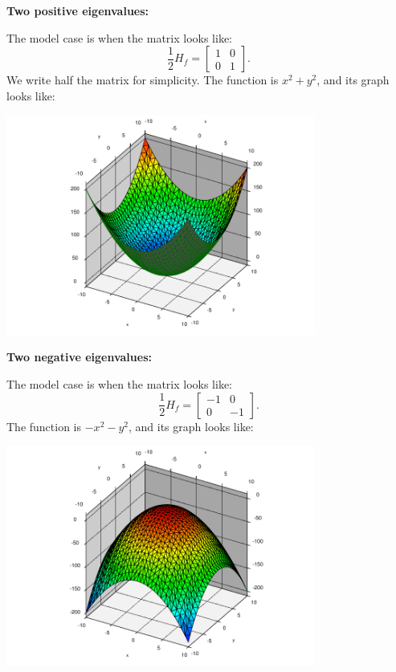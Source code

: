 \documentclass[12pt]{article}
\begin{document}
\bigskip

\textbf{Two positive eigenvalues:}
\nopagebreak

The model case is when the matrix looks like:
\begin{equation*}
\frac{1}{2} H_f
=
\begin{bmatrix}
1 & 0 \\
0 & 1
\end{bmatrix} .
\end{equation*}
We write half the matrix for simplicity.
The function is $x^2+y^2$, and
its graph looks like:
\begin{center}
\includegraphics[width=4.0in]{xsqplusysq}
\end{center}

\bigskip

\pagebreak[2]
\textbf{Two negative eigenvalues:}

The model case is when the matrix looks like:
\begin{equation*}
\frac{1}{2} H_f
=
\begin{bmatrix}
-1 & 0 \\
0 & -1
\end{bmatrix} .
\end{equation*}
The function is $-x^2-y^2$, and
its graph looks like:
\begin{center}
\includegraphics[width=4.0in]{minusxsqminusysq}
\end{center}
\end{document}
